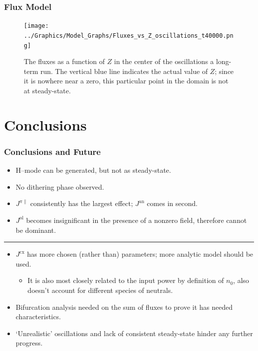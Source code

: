 \documentclass[10pt]{beamer}
\begin{document}
\begin{frame} %
\frametitle{Flux Model}

\begin{figure}[tb] %
	\centering
	\texttt{[image: ../Graphics/Model\_Graphs/Fluxes\_vs\_Z\_oscillations\_t40000.png]}
	\caption{The fluxes as a function of $Z$ in the center of the oscillations a long-term run.
	The vertical blue line indicates the actual value of $Z$; since it is nowhere near a zero, this particular point in the domain is not at steady-state.}
	\label{fig:fluxes_steady-state_40000}
\end{figure}

\end{frame}


\section{Conclusions} %
\begin{frame} %
\frametitle{Conclusions and Future}

\begin{itemize}
	\item H--mode can be generated, but not as steady-state.
	\item No dithering phase observed.
	\item $J^{\pi\parallel}$ consistently has the largest effect; $J^\text{an}$ comes in second.
	\item $J^\text{ol}$ becomes insignificant in the presence of a nonzero field, therefore cannot be dominant.
\end{itemize}
\hrule
\begin{itemize}
	\item $J^\text{cx}$ has more chosen (rather than) parameters; more analytic model should be used.
	\begin{itemize}
		\item It is also most closely related to the input power by definition of $n_0$, also doesn't account for different species of neutrals.
	\end{itemize}
	\item Bifurcation analysis needed on the sum of fluxes to prove it has needed characteristics.
	\item `Unrealistic' oscillations and lack of consistent steady-state hinder any further progress.
\end{itemize}

\end{frame}
\end{document}
